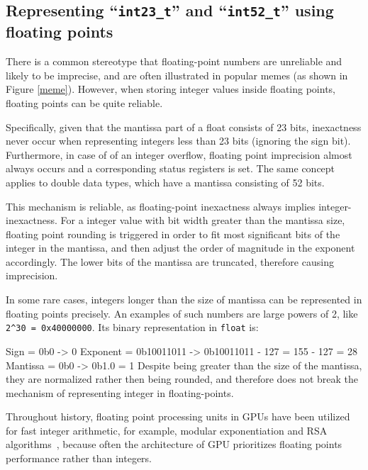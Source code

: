 \documentclass[logo,bsc,singlespacing,parskip]{infthesis}
\newcommand{\dtfloat}{\texttt{float}}
\newenvironment{VerbatimCompact}
  {\vspace*{-2.5mm}\VerbatimEnvironment
   \par\Verbatim}
  {\endVerbatim\vspace*{-2.4mm}}
\begin{document}
\subsection{Representing ``\texttt{int23\_t}'' and ``\texttt{int52\_t}'' using
floating points}
\label{sec:fpe2}

There is a common stereotype that floating-point numbers are unreliable and
likely to be imprecise, and are often illustrated in popular memes (as shown in
Figure \ref{meme}). However, when storing integer values inside floating points, 
floating points can be quite reliable. 

Specifically, given that the mantissa part of a float consists of 23 bits,
inexactness never occur when representing integers less than 23 bits (ignoring
the sign bit). Furthermore, in case of of an integer overflow, floating point
imprecision almost always occurs and a corresponding status registers is set.
The same concept applies to double data types, which have a mantissa consisting
of 52 bits.

This mechanism is reliable, as floating-point inexactness always implies
integer-inexactness. For a integer value with bit width greater than the
mantissa size, floating point rounding is triggered in order to fit most
significant bits of the integer in the mantissa, and then adjust the order of
magnitude in the exponent accordingly. The lower bits of the mantissa are
truncated, therefore causing imprecision. 

In some rare cases, integers longer than the size of mantissa can be represented
in floating points precisely. An examples of such numbers are large powers of 2,
like \texttt{2\^{}30 = 0x40000000}. Its binary representation in \dtfloat{}
is:
\begin{VerbatimCompact}
Sign     = 0b0        -> 0     
Exponent = 0b10011011 -> 0b10011011 - 127 = 155 - 127 = 28             
Mantissa = 0b0        -> 0b1.0 = 1
\end{VerbatimCompact}
Despite being greater than the size of
the mantissa, they are normalized rather then being rounded, and therefore does
not break the mechanism of representing integer in floating-points.

Throughout history, floating point processing units in GPUs have been utilized
for fast integer arithmetic, for example, modular exponentiation
\cite{intfpu-modexp} and RSA algorithms~\cite{intfpu-rsa}, because often the
architecture of GPU prioritizes floating points performance rather than
integers. 
\end{document}
